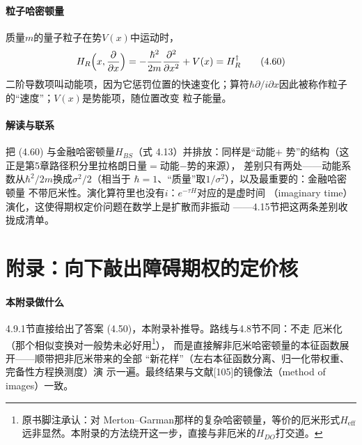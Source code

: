 \paragraph{粒子哈密顿量}
质量$m$的量子粒子在势$V(x)$中运动时，
\begin{equation*}
H_R\Bigl(x,\frac{\partial}{\partial x}\Bigr)
=-\frac{\hbar^{2}}{2m}\frac{\partial^{2}}{\partial x^{2}}+V(x)=H_R^{\dagger}
\tag{4.60}
\end{equation*}
二阶导数项叫动能项，因为它惩罚位置的快速变化；算符$\hbar\partial/
i\partial x$因此被称作粒子的“速度”；$V(x)$是势能项，随位置改变
粒子能量。

\paragraph{解读与联系}
把 (4.60) 与金融哈密顿量$H_{BS}$（式 4.13）并排放：同样是“动能$+$
势”的结构（这正是第5章路径积分里拉格朗日量$=$动能$-$势的来源），
差别只有两处——动能系数从$\hbar^{2}/2m$换成$\sigma^{2}/2$（相当于
$\hbar=1$、“质量”取$1/\sigma^{2}$），以及最重要的：金融哈密顿量
不带厄米性。演化算符里也没有$i$：$e^{-\tau H}$对应的是虚时间
（imaginary time）演化，这使得期权定价问题在数学上是扩散而非振动
——4.15节把这两条差别收拢成清单。

\section{附录：向下敲出障碍期权的定价核}

\paragraph{本附录做什么}
4.9.1节直接给出了答案 (4.50)，本附录补推导。路线与4.8节不同：不走
厄米化（那个相似变换对一般势未必好用\footnote{原书脚注承认：对
Merton--Garman那样的复杂哈密顿量，等价的厄米形式$H_{\mathrm{eff}}$
远非显然。本附录的方法绕开这一步，直接与非厄米的$H_{DO}$打交道。}），
而是直接解非厄米哈密顿量的本征函数展开——顺带把非厄米带来的全部
“新花样”（左右本征函数分离、归一化带权重、完备性方程换测度）演
示一遍。最终结果与文献[105]的镜像法（method of images）一致。

